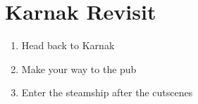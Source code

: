 \chapter{Karnak Revisit}

\vspace{\baselineskip}

\begin{paracol}{2}

\begin{enumerate}
    \item Head back to Karnak
    \item Make your way to the pub
    \item Enter the steamship after the cutscenes
\end{enumerate}

\end{paracol}